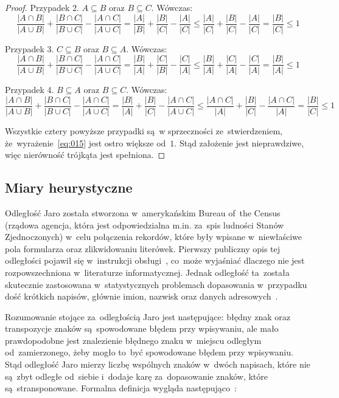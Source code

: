 \documentclass{praca1}
\begin{document}
\begin{proof}
Przypadek 2. $A\subseteq B$ oraz $B \subseteq C$. Wówczas:
$$
\frac{|A\cap B|}{|A\cup B|} + \frac{|B\cap C|}{|B\cup C|} - \frac{|A\cap C|}{|A\cup C|} = 
\frac{|A|}{|B|} + \frac{|B|}{|C|} - \frac{|A|}{|C|} \leq 
\frac{|A|}{|C|} + \frac{|B|}{|C|} - \frac{|A|}{|C|} = 
\frac{|B|}{|C|} \leq 1
$$

Przypadek 3. $C\subseteq B$ oraz $B \subseteq A$. Wówczas:
$$
\frac{|A\cap B|}{|A\cup B|} + \frac{|B\cap C|}{|B\cup C|} - \frac{|A\cap C|}{|A\cup C|} = 
\frac{|B|}{|A|} + \frac{|C|}{|B|} - \frac{|C|}{|A|} \leq 
\frac{|B|}{|A|} + \frac{|C|}{|A|} - \frac{|C|}{|A|} =
\frac{|B|}{|A|} \leq 1
$$

Przypadek 4. $B\subseteq A$ oraz $B \subseteq C$. Wówczas:
$$
\frac{|A\cap B|}{|A\cup B|} + \frac{|B\cap C|}{|B\cup C|} - \frac{|A\cap C|}{|A\cup C|} = 
\frac{|B|}{|A|} + \frac{|B|}{|C|} - \frac{|A\cap C|}{|A\cup C|} \leq 
\frac{|A \cap C|}{|A|} + \frac{|B|}{|C|} - \frac{|A\cap C|}{|A|} =
\frac{|B|}{|C|} \leq 1
$$

Wszystkie cztery powyższe przypadki są~w sprzeczności ze~stwierdzeniem, że~wyrażenie~\eqref{eq:015} jest ostro większe od~$1$. Stąd założenie jest nieprawdziwe, więc nierówność trójkąta jest spełniona.
\end{proof}

\subsection{Miary heurystyczne}


Odległość Jaro została stworzona w~amerykańskim Bureau of~the Census (rządowa agencja, która jest odpowiedzialna m.in. za~spis ludności Stanów Zjednoczonych) w~celu połączenia rekordów, które były wpisane w~niewłaściwe pola formularza oraz zlikwidowaniu literówek. Pierwszy publiczny opis tej odległości pojawił się w~instrukcji obsługi~\cite{Jaro1978:usermanual}, co~może wyjaśniać dlaczego nie jest rozpowszechniona w~literaturze informatycznej. Jednak odległość ta~została skutecznie zastosowana w~statystycznych problemach dopasowania w~przypadku dość krótkich napisów, głównie imion, nazwisk oraz danych adresowych~\cite{Loo2014:stringdist}.

Rozumowanie stojące za~odległością Jaro jest następujące: błędny znak oraz transpozycje znaków są~spowodowane błędem przy wpisywaniu, ale mało prawdopodobne jest znalezienie błędnego znaku w~miejscu odległym od~zamierzonego, żeby mogło to~być spowodowane błędem przy wpisywaniu. Stąd odległość Jaro mierzy liczbę wspólnych znaków w~dwóch napisach, które nie są~zbyt odległe od~siebie i~dodaje karę za~dopasowanie znaków, które są~stransponowane. Formalna definicja wygląda następująco~\cite{Loo2014:stringdist}:
\end{document}
